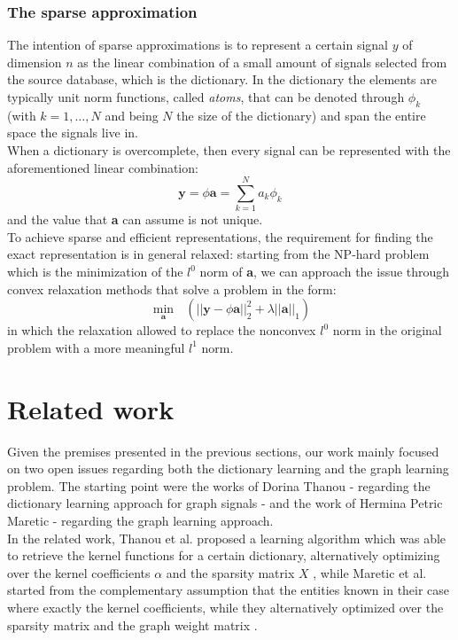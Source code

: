 \subsubsection{The sparse approximation}
The intention of sparse approximations is to represent a certain signal $y$ of dimension $n$ as the linear combination of a small amount of signals selected from the source database, which is the dictionary. In the dictionary the elements are typically unit norm functions, called \textit{atoms}, that can be denoted through $\phi_k$ (with $k = 1,\dots, N$ and being $N$ the size of the dictionary) and span the entire space the signals live in.\\
When a dictionary is overcomplete, then every signal can be represented with the aforementioned linear combination:
\begin{equation}
\textbf{y} = \textbf{$\phi$}\textbf{a} = \sum_{k=1}^{N}a_k\phi_k
\end{equation}
and the value that \textbf{a} can assume is not unique.\\
To achieve sparse and efficient representations, the requirement for finding the exact representation is in general relaxed: starting from the NP-hard problem which is the minimization of the $l^0$ norm of \textbf{a}, we can approach the issue through convex relaxation methods that solve a problem in the form:
\begin{equation}
\min_\textbf{a} \text{ } (|| \textbf{y} - \textbf{$\phi$a} ||_2^2 + \textbf{$\lambda$}||\textbf{a}||_1)
\end{equation}
in which the relaxation allowed to replace the nonconvex $l^0$ norm in the original problem with a more meaningful $l^1$ norm. \cite{Tosic2011}

\section{Related work}
Given the premises presented in the previous sections, our work mainly focused on two open issues regarding both the dictionary learning and the graph learning problem. The starting point were the works of Dorina Thanou -  regarding the dictionary learning approach for graph signals - and the work of Hermina Petric Maretic - regarding the graph learning approach.\\
In the related work, Thanou et al. proposed a learning algorithm which was able to retrieve the kernel functions for a certain dictionary, alternatively optimizing over the kernel coefficients $\alpha$ and the sparsity matrix $X$ \cite{Thanou2014}, while Maretic et al. started from the complementary assumption that the entities known in their case where exactly the kernel coefficients, while they alternatively optimized over the sparsity matrix and the graph weight matrix \cite{Maretic2017}.

